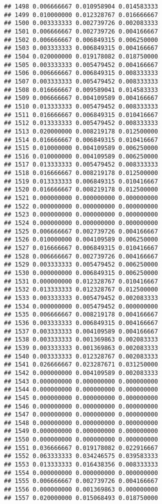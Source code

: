 \documentclass[
]{article}
\begin{document}
\begin{verbatim}
## 1498 0.006666667 0.010958904 0.014583333
## 1499 0.010000000 0.012328767 0.016666667
## 1500 0.003333333 0.002739726 0.002083333
## 1501 0.006666667 0.002739726 0.004166667
## 1502 0.006666667 0.006849315 0.006250000
## 1503 0.003333333 0.006849315 0.004166667
## 1504 0.020000000 0.019178082 0.018750000
## 1505 0.003333333 0.005479452 0.004166667
## 1506 0.006666667 0.006849315 0.008333333
## 1507 0.003333333 0.005479452 0.008333333
## 1508 0.016666667 0.009589041 0.014583333
## 1509 0.006666667 0.004109589 0.004166667
## 1510 0.013333333 0.005479452 0.008333333
## 1511 0.016666667 0.006849315 0.010416667
## 1512 0.013333333 0.005479452 0.008333333
## 1513 0.020000000 0.008219178 0.012500000
## 1514 0.016666667 0.006849315 0.010416667
## 1515 0.010000000 0.004109589 0.006250000
## 1516 0.010000000 0.004109589 0.006250000
## 1517 0.013333333 0.005479452 0.008333333
## 1518 0.016666667 0.008219178 0.012500000
## 1519 0.013333333 0.006849315 0.010416667
## 1520 0.016666667 0.008219178 0.012500000
## 1521 0.000000000 0.000000000 0.000000000
## 1522 0.000000000 0.000000000 0.000000000
## 1523 0.000000000 0.000000000 0.000000000
## 1524 0.000000000 0.000000000 0.000000000
## 1525 0.006666667 0.002739726 0.004166667
## 1526 0.010000000 0.004109589 0.006250000
## 1527 0.016666667 0.006849315 0.010416667
## 1528 0.006666667 0.002739726 0.004166667
## 1529 0.003333333 0.005479452 0.006250000
## 1530 0.000000000 0.006849315 0.006250000
## 1531 0.000000000 0.012328767 0.010416667
## 1532 0.013333333 0.012328767 0.012500000
## 1533 0.003333333 0.005479452 0.002083333
## 1534 0.000000000 0.005479452 0.000000000
## 1535 0.006666667 0.008219178 0.004166667
## 1536 0.003333333 0.006849315 0.004166667
## 1537 0.003333333 0.004109589 0.004166667
## 1538 0.003333333 0.001369863 0.002083333
## 1539 0.003333333 0.001369863 0.002083333
## 1540 0.003333333 0.012328767 0.002083333
## 1541 0.026666667 0.023287671 0.031250000
## 1542 0.000000000 0.004109589 0.002083333
## 1543 0.000000000 0.000000000 0.000000000
## 1544 0.000000000 0.000000000 0.000000000
## 1545 0.000000000 0.000000000 0.000000000
## 1546 0.000000000 0.000000000 0.000000000
## 1547 0.000000000 0.000000000 0.000000000
## 1548 0.000000000 0.000000000 0.000000000
## 1549 0.000000000 0.000000000 0.000000000
## 1550 0.000000000 0.000000000 0.000000000
## 1551 0.036666667 0.019178082 0.022916667
## 1552 0.063333333 0.034246575 0.039583333
## 1553 0.013333333 0.016438356 0.008333333
## 1554 0.000000000 0.000000000 0.000000000
## 1555 0.006666667 0.002739726 0.004166667
## 1556 0.000000000 0.001369863 0.000000000
## 1557 0.020000000 0.015068493 0.018750000

\end{verbatim}
\end{document}
